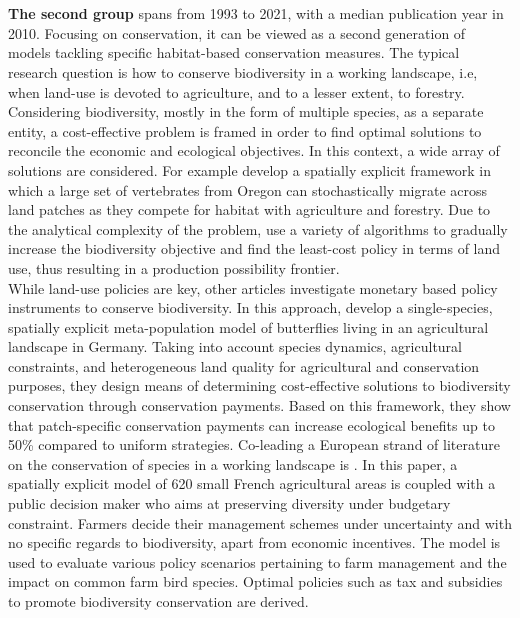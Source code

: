 \\\\
\hspace*{1.5em}\textbf{The second group} spans from 1993 to 2021, with a median publication year in 2010. Focusing on conservation, it can be viewed as a second generation of models tackling specific habitat-based conservation measures. The typical research question is how to conserve biodiversity in a working landscape, i.e, when land-use is devoted to agriculture, and to a lesser extent, to forestry. Considering biodiversity, mostly in the form of multiple species, as a separate entity, a cost-effective problem is framed in order to find optimal solutions to reconcile the economic and ecological objectives. 
In this context, a wide array of solutions are considered. For example \cite{Polasky2005} develop a spatially explicit framework in which a large set of vertebrates from Oregon can stochastically migrate across land patches as they compete for habitat with agriculture and forestry.  Due to the analytical complexity of the problem, \cite{Polasky2005} use a variety of algorithms to gradually increase the biodiversity objective and find the least-cost policy in terms of land use, thus resulting in a production possibility frontier. \\
While land-use policies are key, other articles investigate monetary based policy instruments to conserve biodiversity. In this approach, \cite{DRECHSLER2007} develop a single-species, spatially explicit meta-population model of butterflies living in an agricultural landscape in Germany. Taking into account species dynamics, agricultural constraints, and heterogeneous land quality for agricultural and conservation purposes, they design means of determining cost-effective solutions to biodiversity conservation through conservation payments. Based on this framework, they show that patch-specific conservation payments can increase ecological benefits up to 50\% compared to uniform strategies.
Co-leading a European strand of literature on the conservation of species in a working landscape is \cite{Mouysset2012}. In this paper, a spatially explicit model of 620 small French agricultural areas is coupled with a public decision maker who aims at preserving diversity under budgetary constraint. Farmers decide their management schemes under uncertainty and with no specific regards to biodiversity, apart from economic incentives. The model is used to evaluate various policy scenarios pertaining to farm management and the impact on common farm bird species. Optimal policies such as tax and subsidies to promote biodiversity conservation are derived. 
